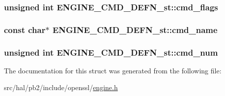 \subsubsection[{\texorpdfstring{cmd\+\_\+flags}{cmd_flags}}]{\setlength{\rightskip}{0pt plus 5cm}unsigned int E\+N\+G\+I\+N\+E\+\_\+\+C\+M\+D\+\_\+\+D\+E\+F\+N\+\_\+st\+::cmd\+\_\+flags}\hypertarget{struct_e_n_g_i_n_e___c_m_d___d_e_f_n__st_aa2dae056d36094415cdc11e6c7cac4a5}{}\label{struct_e_n_g_i_n_e___c_m_d___d_e_f_n__st_aa2dae056d36094415cdc11e6c7cac4a5}
\subsubsection[{\texorpdfstring{cmd\+\_\+name}{cmd_name}}]{\setlength{\rightskip}{0pt plus 5cm}const char$\ast$ E\+N\+G\+I\+N\+E\+\_\+\+C\+M\+D\+\_\+\+D\+E\+F\+N\+\_\+st\+::cmd\+\_\+name}\hypertarget{struct_e_n_g_i_n_e___c_m_d___d_e_f_n__st_a852b7bb98dcb5c946e4574f33cbc40ac}{}\label{struct_e_n_g_i_n_e___c_m_d___d_e_f_n__st_a852b7bb98dcb5c946e4574f33cbc40ac}
\subsubsection[{\texorpdfstring{cmd\+\_\+num}{cmd_num}}]{\setlength{\rightskip}{0pt plus 5cm}unsigned int E\+N\+G\+I\+N\+E\+\_\+\+C\+M\+D\+\_\+\+D\+E\+F\+N\+\_\+st\+::cmd\+\_\+num}\hypertarget{struct_e_n_g_i_n_e___c_m_d___d_e_f_n__st_a4868776e2cc8f219c161072902b27761}{}\label{struct_e_n_g_i_n_e___c_m_d___d_e_f_n__st_a4868776e2cc8f219c161072902b27761}


The documentation for this struct was generated from the following file\+:\begin{DoxyCompactItemize}
\item 
src/hal/pb2/include/openssl/\hyperlink{engine_8h}{engine.\+h}\end{DoxyCompactItemize}
